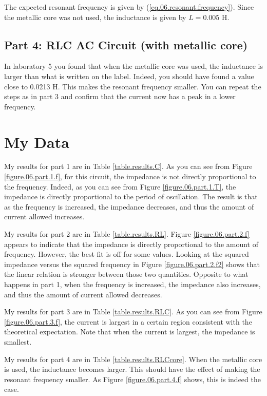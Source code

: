 The expected resonant frequency is given by (\ref{eq.06.resonant.frequency}). Since the metallic core was not used, the inductance is given by $L = 0.005$ H.
\subsection{Part 4: RLC AC Circuit (with metallic core)}
In laboratory 5 you found that when the metallic core was used, the inductance is larger than what is written on the label. Indeed, you should have found a value close to 0.0213 H. This makes the resonant frequency smaller. You can repeat the steps as in part 3 and confirm that the current now has a peak in a lower frequency.
\section{My Data}
My results for part 1 are in Table \ref{table.results.C}. As you can see from Figure \ref{figure.06.part.1.f}, for this circuit, the impedance is not directly proportional to the frequency. Indeed, as you can see from Figure \ref{figure.06.part.1.T}, the impedance is directly proportional to the period of oscillation. The result is that as the frequency is increased, the impedance decreases, and thus the amount of current allowed increases.

My results for part 2 are in Table \ref{table.results.RL}. Figure \ref{figure.06.part.2.f} appears to indicate that the impedance is directly proportional to the amount of frequency. However, the best fit is off for some values. Looking at the squared impedance versus the squared frequency in Figure \ref{figure.06.part.2.f2} shows that the linear relation is stronger between those two quantities. Opposite to what happens in part 1, when the frequency is increased, the impedance also increases, and thus the amount of current allowed decreases.

My results for part 3 are in Table \ref{table.results.RLC}. As you can see from Figure \ref{figure.06.part.3.f}, the current is largest in a certain region consistent with the theoretical expectation. Note that when the current is largest, the impedance is smallest.

My results for part 4 are in Table \ref{table.results.RLCcore}. When the metallic core is used, the inductance becomes larger. This should have the effect of making the resonant frequency smaller. As Figure \ref{figure.06.part.4.f} shows, this is indeed the case.
